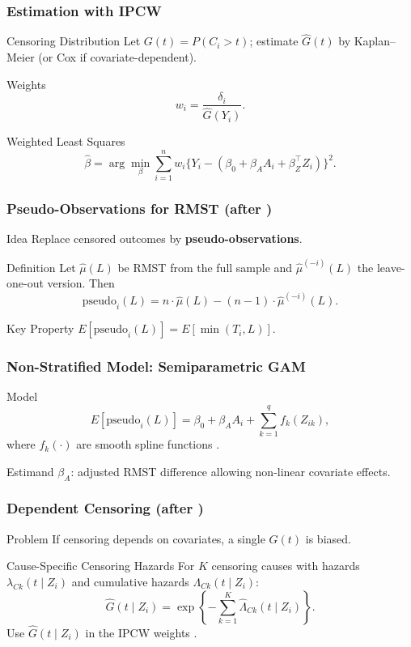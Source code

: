 \documentclass{beamer}
\begin{document}
\begin{frame}
\frametitle{Estimation with IPCW}
\begin{block}{Censoring Distribution}
Let $G(t) = P(C_i > t)$; estimate $\widehat{G}(t)$ by Kaplan--Meier (or Cox if covariate-dependent).
\end{block}
\begin{block}{Weights}
\[
w_i = \frac{\delta_i}{\widehat{G}(Y_i)}.
\]
\end{block}
\begin{block}{Weighted Least Squares}
\[
\widehat{\beta} = \arg\min_\beta \sum_{i=1}^n w_i \Big\{ Y_i - (\beta_0 + \beta_A A_i + \beta_Z^\top Z_i)\Big\}^2.
\]
\end{block}
\end{frame}

\begin{frame}
\frametitle{Pseudo-Observations for RMST (after \cite{andersen2010})}
\begin{block}{Idea}
Replace censored outcomes by \textbf{pseudo-observations}.
\end{block}
\begin{block}{Definition}
Let $\widehat{\mu}(L)$ be RMST from the full sample and $\widehat{\mu}^{(-i)}(L)$ the leave-one-out version. Then
\[
\text{pseudo}_i(L) = n \cdot \widehat{\mu}(L) - (n-1)\cdot \widehat{\mu}^{(-i)}(L).
\]
\end{block}
\begin{block}{Key Property}
$E[\text{pseudo}_i(L)] = E[\min(T_i,L)]$.
\end{block}
\end{frame}

\begin{frame}
\frametitle{Non-Stratified Model: Semiparametric GAM}
\begin{block}{Model}
\[
E[\text{pseudo}_i(L)] = \beta_0 + \beta_A A_i + \sum_{k=1}^{q} f_k(Z_{ik}),
\]
where $f_k(\cdot)$ are smooth spline functions \cite{hastie1990}.
\end{block}
\begin{block}{Estimand}
$\beta_A$: adjusted RMST difference allowing non-linear covariate effects.
\end{block}
\end{frame}

\begin{frame}
\frametitle{Dependent Censoring (after \cite{wang2018})}
\begin{block}{Problem}
If censoring depends on covariates, a single $G(t)$ is biased.
\end{block}
\begin{block}{Cause-Specific Censoring Hazards}
For $K$ censoring causes with hazards $\lambda_{Ck}(t \mid Z_i)$ and cumulative hazards $\Lambda_{Ck}(t \mid Z_i)$:
\[
\widehat{G}(t \mid Z_i) = \exp\!\left\{-\sum_{k=1}^{K} \widehat{\Lambda}_{Ck}(t \mid Z_i)\right\}.
\]
Use $\widehat{G}(t \mid Z_i)$ in the IPCW weights \cite{robins1992}.
\end{block}
\end{frame}
\end{document}
